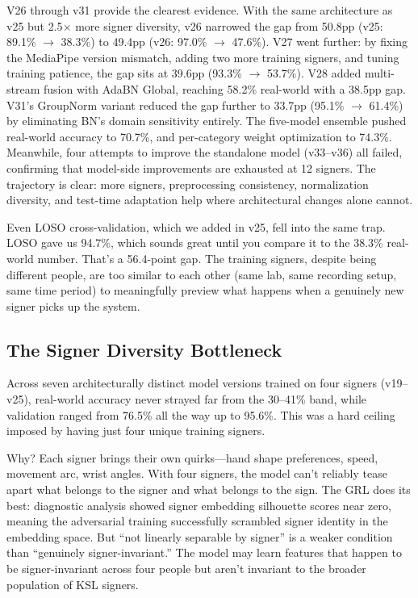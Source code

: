 \documentclass[conference]{IEEEtran}
\begin{document}
V26 through v31 provide the clearest evidence. With the same architecture as v25 but 2.5$\times$ more signer diversity, v26 narrowed the gap from 50.8pp (v25: 89.1\% $\to$ 38.3\%) to 49.4pp (v26: 97.0\% $\to$ 47.6\%). V27 went further: by fixing the MediaPipe version mismatch, adding two more training signers, and tuning training patience, the gap sits at 39.6pp (93.3\% $\to$ 53.7\%). V28 added multi-stream fusion with AdaBN Global, reaching 58.2\% real-world with a 38.5pp gap. V31's GroupNorm variant reduced the gap further to 33.7pp (95.1\% $\to$ 61.4\%) by eliminating BN's domain sensitivity entirely. The five-model ensemble pushed real-world accuracy to 70.7\%, and per-category weight optimization to 74.3\%. Meanwhile, four attempts to improve the standalone model (v33--v36) all failed, confirming that model-side improvements are exhausted at 12 signers. The trajectory is clear: more signers, preprocessing consistency, normalization diversity, and test-time adaptation help where architectural changes alone cannot.

Even LOSO cross-validation, which we added in v25, fell into the same trap. LOSO gave us 94.7\%, which sounds great until you compare it to the 38.3\% real-world number. That's a 56.4-point gap. The training signers, despite being different people, are too similar to each other (same lab, same recording setup, same time period) to meaningfully preview what happens when a genuinely new signer picks up the system.

\subsection{The Signer Diversity Bottleneck}

Across seven architecturally distinct model versions trained on four signers (v19--v25), real-world accuracy never strayed far from the 30--41\% band, while validation ranged from 76.5\% all the way up to 95.6\%. This was a hard ceiling imposed by having just four unique training signers.

Why? Each signer brings their own quirks---hand shape preferences, speed, movement arc, wrist angles. With four signers, the model can't reliably tease apart what belongs to the signer and what belongs to the sign. The GRL does its best: diagnostic analysis showed signer embedding silhouette scores near zero, meaning the adversarial training successfully scrambled signer identity in the embedding space. But ``not linearly separable by signer'' is a weaker condition than ``genuinely signer-invariant.'' The model may learn features that happen to be signer-invariant across four people but aren't invariant to the broader population of KSL signers.
\end{document}
